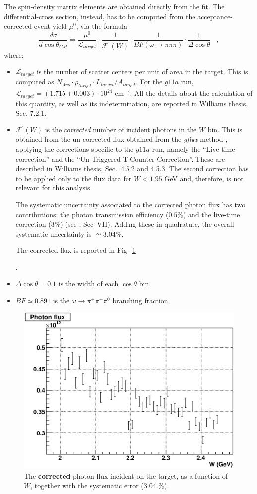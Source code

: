 \documentclass[a4paper,10pt]{report}
\begin{document}
The spin-density matrix elements are obtained directly from the fit. 
The differential-cross section, instead, has to be computed from the acceptance-corrected event yield $\mu^0$, via the formula:
\begin{equation}
\frac{d\sigma}{d\cos\theta_{CM}} = \frac{\mu^0}{\mathcal{L}_{target}} \cdot \frac{1}{\mathcal{F}^\prime (W)} \cdot  \frac{1}{BF(\omega\rightarrow \pi \pi \pi)} \cdot \frac{1}{\Delta\cos\theta} \; \; \; ,
\end{equation}
where:
\begin{itemize}
\item{$\mathcal{L}_{target}$ is the number of scatter centers per unit of area in the target. This is computed as $N_{Avo} \cdot \rho_{target} \cdot L_{target} / A_{target}$. For the $g11a$ run, $\mathcal{L}_{target}=(1.715\pm 0.003)\cdot 10^{24}$ cm$^{-2}$. 
All the details about the calculation of this quantity, as well as its indetermination, are reported in Williams thesis, Sec. 7.2.1.}
\item{$\mathcal{F}^\prime(W)$ is the \textit{corrected} number of incident photons in the $W$ bin.
This is obtained from the un-corrected flux obtained from the \textit{gflux} method \cite{gflux}, applying the corrections specific to the $g11a$ run, namely the ``Live-time correction'' and the ``Un-Triggered T-Counter Correction''. 
These are described in Williams thesis, Sec.~4.5.2 and 4.5.3. The second correction has to be applied only to the flux data for $W<1.95$ GeV and, therefore, is not relevant for this analysis.

The systematic uncertainty associated to the corrected photon flux has two contributions: the photon transmission efficiency ($0.5\%$) and the live-time correction ($3\%$) (see \cite{Williams:2009ab}, Sec~VII).
Adding these in quadrature, the overall systematic uncertainty is $\simeq 3.04\%$.


The corrected flux is reported in Fig.~\ref{fig:flux}}.
\item{$\Delta \cos \theta = 0.1$ is the width of each $\cos \theta$ bin.}
\item{$BF \simeq 0.891$ is the $\omega \rightarrow \pi^+ \pi^- \pi^0$ branching fraction.} 
\end{itemize}
\begin{figure}[tpb]
\centering
\includegraphics[width=.7 \textwidth]{xsec/flux.eps}
\caption{\label{fig:flux} The \textbf{corrected} photon flux incident on the target, as a function of $W$, together with the systematic error (3.04 $\%$).}
\end{figure}
\end{document}

